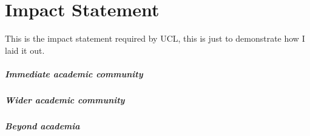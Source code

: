 \chapter*{Impact Statement}
This is the impact statement required by UCL, this is just to demonstrate how I laid it out.

\paragraph{Immediate academic community}
\blindtext


\paragraph{Wider academic community}
\blindtext


\paragraph{Beyond academia}
\blindtext

\acresetall
